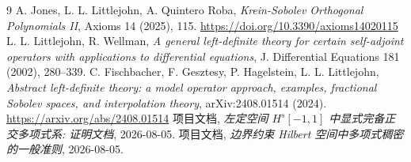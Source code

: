 \documentclass[UTF8]{ctexart}
\begin{document}
\begin{thebibliography}{9}
 A. Jones, L. L. Littlejohn, A. Quintero Roba, \emph{Krein-Sobolev
	Orthogonal Polynomials II}, Axioms 14 (2025), 115.
	\url{https://doi.org/10.3390/axioms14020115}
 L. L. Littlejohn, R. Wellman, \emph{A general left-definite theory
	for certain self-adjoint operators with applications to differential equations},
	J. Differential Equations 181 (2002), 280--339.
 C. Fischbacher, F. Gesztesy, P. Hagelstein, L. L. Littlejohn,
	\emph{Abstract left-definite theory: a model operator approach, examples,
	fractional Sobolev spaces, and interpolation theory}, arXiv:2408.01514 (2024).
	\url{https://arxiv.org/abs/2408.01514}
 项目文档, \emph{左定空间 $H^s[-1,1]$ 中显式完备正交多项式系: 证明文档},
	2026-08-05.
 项目文档, \emph{边界约束 Hilbert 空间中多项式稠密的一般准则},
	2026-08-05.
\end{thebibliography}
\end{document}
